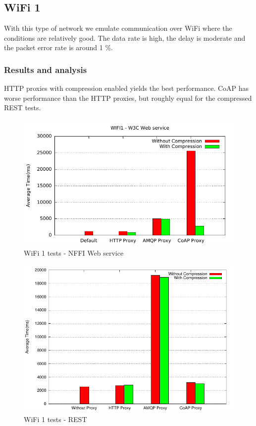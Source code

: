 \subsection{WiFi 1}

With this type of network we emulate communication over WiFi where the
conditions are relatively good. The data rate is high, the delay is moderate
and the packet error rate is around 1 \%.

\subsubsection{Results and analysis}

HTTP proxies with compression enabled yields the best performance. CoAP has
worse performance than the HTTP proxies, but roughly equal for the compressed
REST tests.


\begin{figure}[H]
\center
\includegraphics[scale=0.75]{../results/wifi1/nffi/out.pdf}
\caption{WiFi 1 tests - NFFI Web service}
\end{figure}

\begin{figure}[H]
\center
\includegraphics[scale=0.75]{../results/wifi1/rest/result.pdf}
\caption{WiFi 1 tests - REST}
\end{figure}


